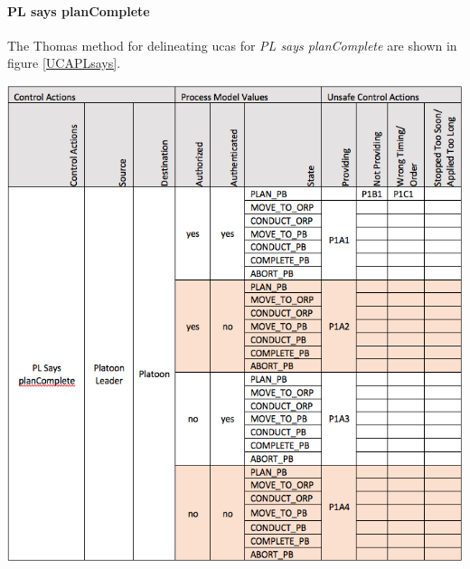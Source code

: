 \documentclass[../../main/main.tex]{subfiles}
\begin{document}
\paragraph*{PL says planComplete}
The Thomas method for delineating \glspl{uca} for \textit{PL says planComplete} are shown in figure \ref{UCAPLsays}.
\begin{table}[ht!]
\begin{center}
\includegraphics[width=\linewidth]{../figures/UCAPLsays}
\caption{Unsafe control actions \glspl{uca} for control action "PL says planComplete."}
\label{UCAPLsays}
\end{center}
\end{table}

\clearpage
\end{document}
